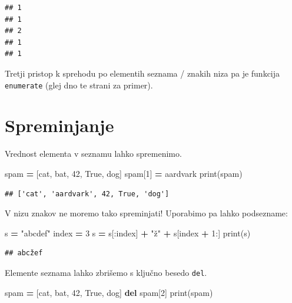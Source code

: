 \documentclass[
]{report}
\newenvironment{Shaded}{\begin{snugshade}}{\end{snugshade}}
\newcommand{\BuiltInTok}[1]{#1}
\newcommand{\DecValTok}[1]{\textcolor[rgb]{0.00,0.00,0.81}{#1}}
\newcommand{\KeywordTok}[1]{\textcolor[rgb]{0.13,0.29,0.53}{\textbf{#1}}}
\newcommand{\NormalTok}[1]{#1}
\newcommand{\OperatorTok}[1]{\textcolor[rgb]{0.81,0.36,0.00}{\textbf{#1}}}
\newcommand{\StringTok}[1]{\textcolor[rgb]{0.31,0.60,0.02}{#1}}
\newcommand{\VariableTok}[1]{\textcolor[rgb]{0.00,0.00,0.00}{#1}}
\begin{document}
\begin{verbatim}
## 1
## 1
## 2
## 1
## 1
\end{verbatim}

Tretji pristop k sprehodu po elementih seznama / znakih niza pa je funkcija \texttt{enumerate} (glej dno te strani za primer).

\hypertarget{spreminjanje}{%
\section{Spreminjanje}\label{spreminjanje}}

Vrednost elementa v seznamu lahko spremenimo.

\begin{Shaded}
\begin{Highlighting}[]
\NormalTok{spam }\OperatorTok{=}\NormalTok{ [}\StringTok{\textquotesingle{}cat\textquotesingle{}}\NormalTok{, }\StringTok{\textquotesingle{}bat\textquotesingle{}}\NormalTok{, }\DecValTok{42}\NormalTok{, }\VariableTok{True}\NormalTok{, }\StringTok{\textquotesingle{}dog\textquotesingle{}}\NormalTok{]}
\NormalTok{spam[}\DecValTok{1}\NormalTok{] }\OperatorTok{=} \StringTok{\textquotesingle{}aardvark\textquotesingle{}}
\BuiltInTok{print}\NormalTok{(spam)}
\end{Highlighting}
\end{Shaded}

\begin{verbatim}
## ['cat', 'aardvark', 42, True, 'dog']
\end{verbatim}

V nizu znakov ne moremo tako spreminjati! Uporabimo pa lahko podsezname:

\begin{Shaded}
\begin{Highlighting}[]
\NormalTok{s }\OperatorTok{=} \StringTok{"abcdef"}
\NormalTok{index }\OperatorTok{=} \DecValTok{3}
\NormalTok{s }\OperatorTok{=}\NormalTok{ s[:index] }\OperatorTok{+} \StringTok{"ž"} \OperatorTok{+}\NormalTok{ s[index }\OperatorTok{+} \DecValTok{1}\NormalTok{:]}
\BuiltInTok{print}\NormalTok{(s)}
\end{Highlighting}
\end{Shaded}

\begin{verbatim}
## abcžef
\end{verbatim}

Elemente seznama lahko zbrišemo s ključno besedo \texttt{del}.

\begin{Shaded}
\begin{Highlighting}[]
\NormalTok{spam }\OperatorTok{=}\NormalTok{ [}\StringTok{\textquotesingle{}cat\textquotesingle{}}\NormalTok{, }\StringTok{\textquotesingle{}bat\textquotesingle{}}\NormalTok{, }\DecValTok{42}\NormalTok{, }\VariableTok{True}\NormalTok{, }\StringTok{\textquotesingle{}dog\textquotesingle{}}\NormalTok{]}
\KeywordTok{del}\NormalTok{ spam[}\DecValTok{2}\NormalTok{]}
\BuiltInTok{print}\NormalTok{(spam)}
\end{Highlighting}
\end{Shaded}
\end{document}
